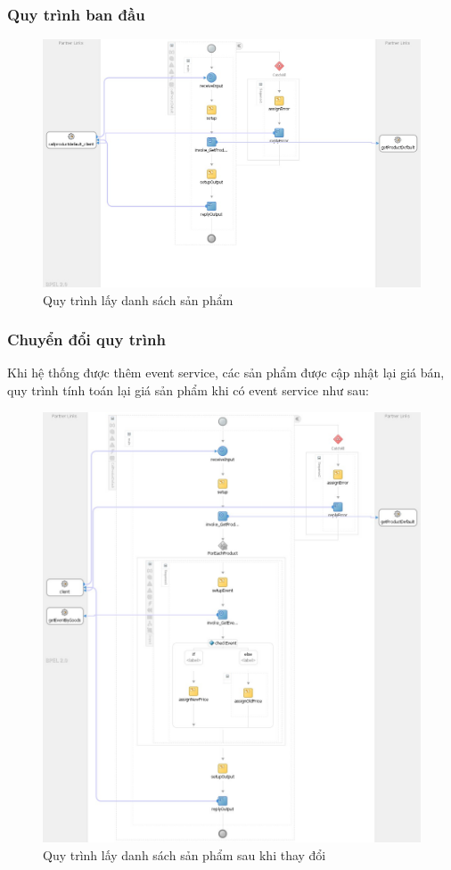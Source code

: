 \subsubsection*{Quy trình ban đầu}
\begin{figure}[!htp]
    \centering
    \includegraphics[width=12cm]{img/bpel/productDefault.jpg}
    \newline
    \caption{Quy trình lấy danh sách sản phẩm}
\end{figure}

\subsubsection*{Chuyển đổi quy trình}
Khi hệ thống được thêm event service, các sản phẩm được cập nhật lại giá bán, quy trình tính toán lại giá sản phẩm khi có event service như sau:
\begin{figure}[!htp]
    \centering
    \includegraphics[width=14cm]{img/bpel/productDefaultAfter.jpg}
    \newline
    \caption{Quy trình lấy danh sách sản phẩm sau khi thay đổi}
\end{figure}

